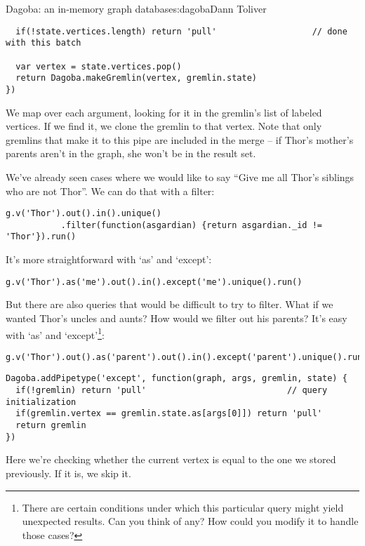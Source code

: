 \begin{aosachapter}{Dagoba: an in-memory graph database}{s:dagoba}{Dann Toliver}
\begin{verbatim}
  if(!state.vertices.length) return 'pull'                   // done with this batch

  var vertex = state.vertices.pop()
  return Dagoba.makeGremlin(vertex, gremlin.state)
})
\end{verbatim}

We map over each argument, looking for it in the gremlin's list of
labeled vertices. If we find it, we clone the gremlin to that vertex.
Note that only gremlins that make it to this pipe are included in the
merge -- if Thor's mother's parents aren't in the graph, she won't be in
the result set.

\label{except}

We've already seen cases where we would like to say ``Give me all Thor's
siblings who are not Thor''. We can do that with a filter:

\begin{verbatim}
g.v('Thor').out().in().unique()
           .filter(function(asgardian) {return asgardian._id != 'Thor'}).run()
\end{verbatim}

It's more straightforward with `as' and `except':

\begin{verbatim}
g.v('Thor').as('me').out().in().except('me').unique().run()
\end{verbatim}

But there are also queries that would be difficult to try to filter.
What if we wanted Thor's uncles and aunts? How would we filter out his
parents? It's easy with `as' and `except'\footnote{There are certain
  conditions under which this particular query might yield unexpected
  results. Can you think of any? How could you modify it to handle those
  cases?}:

\begin{verbatim}
g.v('Thor').out().as('parent').out().in().except('parent').unique().run()
\end{verbatim}

\begin{verbatim}
Dagoba.addPipetype('except', function(graph, args, gremlin, state) {
  if(!gremlin) return 'pull'                            // query initialization
  if(gremlin.vertex == gremlin.state.as[args[0]]) return 'pull'
  return gremlin
})
\end{verbatim}

Here we're checking whether the current vertex is equal to the one we
stored previously. If it is, we skip it.


\end{aosachapter}
